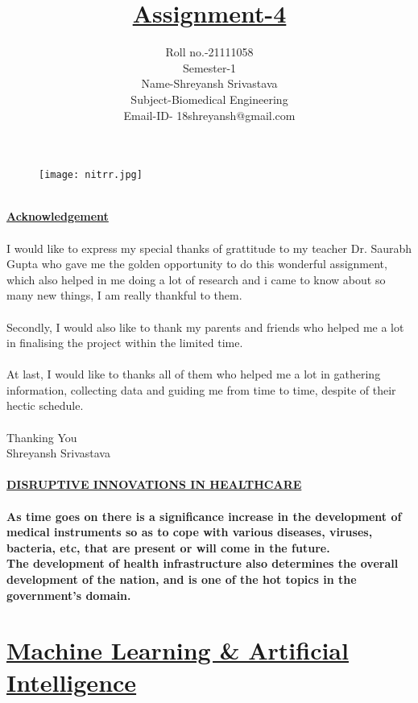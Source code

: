 \documentclass[12pt]{article}
\title{\textbf{\underline{Assignment-4}}}
\date{Roll no.-21111058\\Semester-1\\\Large {Name-Shreyansh Srivastava}\\Subject-Biomedical Engineering\\Email-ID- 18shreyansh@gmail.com}
\begin{document}
	\maketitle
	\begin{figure}[h]
		\centering
		\texttt{[image: nitrr.jpg]}
	\end{figure}
	\clearpage
	\begin{Acknowledgement}
		\\\Huge{\textbf{\underline{Acknowledgement}}}\\
		\\\large I would like to express my special thanks of grattitude to my teacher Dr. Saurabh Gupta who gave me the golden opportunity to do this wonderful assignment, which also helped in me doing a lot of research and i came to know about so many new things, I am really thankful to them.\\\\
		Secondly, I would also like to thank my parents and friends who helped me a lot in finalising the project within the limited time.\\\\
		At last, I would like to thanks all of them who helped me a lot in gathering information, collecting data and guiding me from time to time, despite of their hectic schedule.\\\\
		Thanking You\\
		Shreyansh Srivastava
	\end{Acknowledgement}
	\clearpage
	\paragraph{\textbf{\underline{\Large DISRUPTIVE INNOVATIONS IN HEALTHCARE}}
	\\\\As time goes on there is a significance increase in the development of medical instruments so as to cope with various diseases, viruses, bacteria, etc, that are present or will come in the future. 
    \\The development of health infrastructure also determines the overall development of the nation, and is one of the hot topics in the government's domain.}
	\section{\underline{Machine Learning \& Artificial Intelligence}}
\end{document}
